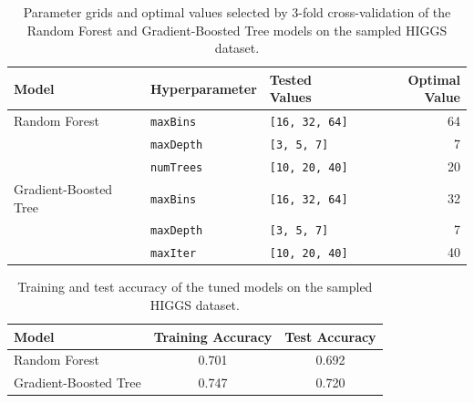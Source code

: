 \documentclass[12pt, a4paper]{article}
\begin{document}
\begin{table}[htbp]
    \centering
    \caption{Parameter grids and optimal values selected by 3-fold cross-validation of the Random Forest and Gradient-Boosted Tree models on the sampled HIGGS dataset.}
    \label{tab:paramGrids}
    \begin{tabular}{lllr}
        \toprule
        Model & Hyperparameter & Tested Values & Optimal Value \\
        \midrule
        Random Forest & \texttt{maxBins} & \texttt{[16, 32, 64]} & 64\\
                      & \texttt{maxDepth} & \texttt{[3, 5, 7]} & 7\\
                      & \texttt{numTrees} & \texttt{[10, 20, 40]} & 20\\
        \midrule
        Gradient-Boosted Tree & \texttt{maxBins} & \texttt{[16, 32, 64]} & 32 \\
                              & \texttt{maxDepth} & \texttt{[3, 5, 7]} & 7\\
                              & \texttt{maxIter} & \texttt{[10, 20, 40]} & 40\\
        \bottomrule
    \end{tabular}
\end{table}
\begin{table}[htbp]
    \centering
    \caption{Training and test accuracy of the tuned models on the sampled HIGGS dataset.}
    \label{tab:q3_sample_performance}
    \begin{tabular}{lcc}
        \toprule
        Model & Training Accuracy & Test Accuracy \\
        \midrule
        Random Forest & 0.701 & 0.692 \\
        Gradient-Boosted Tree & 0.747 & 0.720 \\
        \bottomrule
    \end{tabular}
\end{table}
\end{document}
